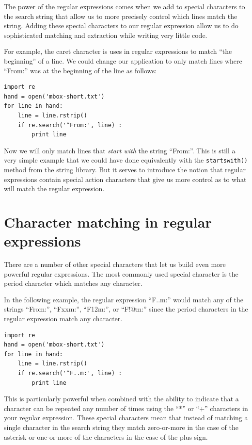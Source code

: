 \documentclass[11pt]{book}
\begin{document}
The power of the regular expressions comes when we add to special characters to the search string that allow us to more precisely control which lines match the string.  Adding these special characters to our regular expression allow us to do sophisticated matching and extraction while writing very little code.

For example, the caret character is uses in regular 
expressions to match ``the beginning'' of a line.
We could change our application to only match 
lines where ``From:'' was at the beginning of the line as follows:

\beforeverb
\begin{verbatim}
import re
hand = open('mbox-short.txt')
for line in hand:
    line = line.rstrip()
    if re.search('^From:', line) :
        print line
\end{verbatim}
\afterverb
%
Now we will only match lines that {\em start with} the string ``From:''.  This is still a very simple example that we could have done equivalently with the {\tt startswith()} method from the string library.  But it serves to introduce the notion that regular expressions contain special action characters that give us more control as to what will match the regular expression.

\section{Character matching in regular expressions}

There are a number of other special characters that let us build even more powerful regular expressions.  The most commonly used special character is the period character which matches any character.

In the following example, the regular expression ``F..m:'' would match any of the strings ``From:'', ``Fxxm:'', ``F12m:'', or ``F!@m:'' since the period characters in the regular expression match any character.

\beforeverb
\begin{verbatim}
import re
hand = open('mbox-short.txt')
for line in hand:
    line = line.rstrip()
    if re.search('^F..m:', line) :
        print line
\end{verbatim}
\afterverb
%
This is particularly powerful when combined with the ability to indicate that a character can be repeated any number of times using the ``*'' or ``+'' characters in your regular expression.   These special characters mean that instead of matching a single character in the search string they match zero-or-more in the case of the asterisk or one-or-more of the characters in the case of the plus sign.
\end{document}
